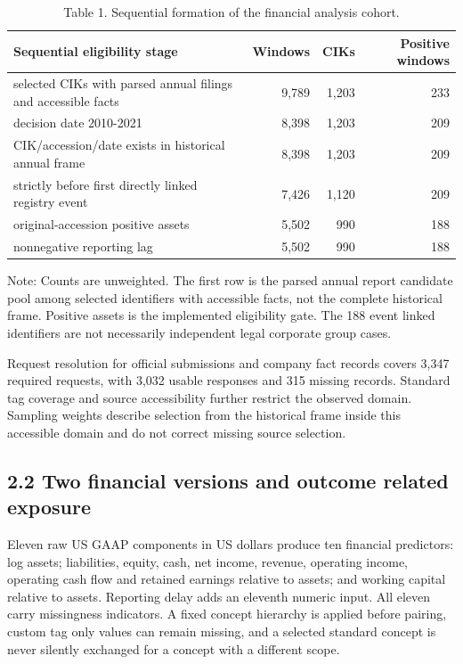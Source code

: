 \documentclass[10pt,a4paper,twocolumn]{article}
\begin{document}
\begin{table}[tbp]
\centering
\small
\caption{Table 1. Sequential formation of the financial analysis cohort.}
\label{main-tab-1}
\begin{tabular}{lrrr}
\toprule
Sequential eligibility stage & Windows & CIKs & Positive windows \\
\midrule
selected CIKs with parsed annual filings and accessible facts & 9,789 & 1,203 & 233 \\
decision date 2010-2021 & 8,398 & 1,203 & 209 \\
CIK/accession/date exists in historical annual frame & 8,398 & 1,203 & 209 \\
strictly before first directly linked registry event & 7,426 & 1,120 & 209 \\
original-accession positive assets & 5,502 & 990 & 188 \\
nonnegative reporting lag & 5,502 & 990 & 188 \\
\bottomrule
\end{tabular}
\end{table}

Note: Counts are unweighted. The first row is the parsed annual report candidate pool among selected identifiers with accessible facts, not the complete historical frame. Positive assets is the implemented eligibility gate. The 188 event linked identifiers are not necessarily independent legal corporate group cases.

Request resolution for official submissions and company fact records covers 3,347 required requests, with 3,032 usable responses and 315 missing records. Standard tag coverage and source accessibility further restrict the observed domain. Sampling weights describe selection from the historical frame inside this accessible domain and do not correct missing source selection.

\subsection{2.2 Two financial versions and outcome related exposure}

Eleven raw US GAAP components in US dollars produce ten financial predictors: log assets; liabilities, equity, cash, net income, revenue, operating income, operating cash flow and retained earnings relative to assets; and working capital relative to assets. Reporting delay adds an eleventh numeric input. All eleven carry missingness indicators. A fixed concept hierarchy is applied before pairing, custom tag only values can remain missing, and a selected standard concept is never silently exchanged for a concept with a different scope.
\end{document}
